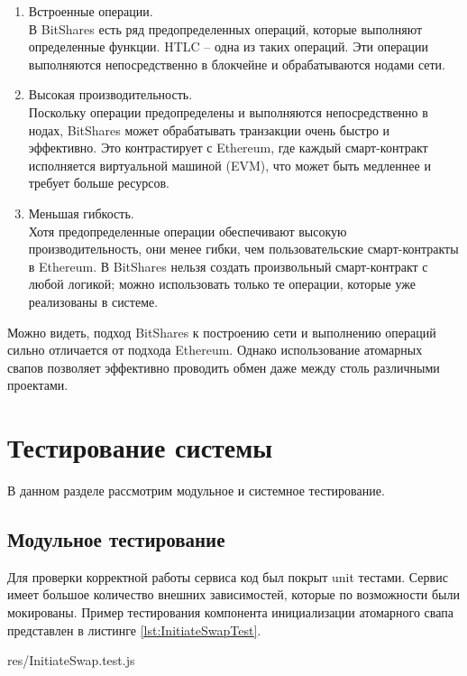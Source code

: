 \begin{enumerate}
\item Встроенные операции.\\
В BitShares есть ряд предопределенных операций, которые выполняют определенные функции. HTLC – одна из таких операций. Эти операции выполняются непосредственно в блокчейне и обрабатываются нодами сети.
\item Высокая производительность.\\
Поскольку операции предопределены и выполняются непосредственно в нодах, BitShares может обрабатывать транзакции очень быстро и эффективно. Это контрастирует с Ethereum, где каждый смарт-контракт исполняется виртуальной машиной (EVM), что может быть медленнее и требует больше ресурсов.
\item Меньшая гибкость.\\
Хотя предопределенные операции обеспечивают высокую производительность, они менее гибки, чем пользовательские смарт-контракты в Ethereum. В BitShares нельзя создать произвольный смарт-контракт с любой логикой; можно использовать только те операции, которые уже реализованы в системе.
\end{enumerate}

Можно видеть, подход BitShares к построению сети и выполнению операций сильно отличается от подхода Ethereum. Однако использование атомарных свапов позволяет эффективно проводить обмен даже между столь различными проектами.

\section{Тестирование системы}

В данном разделе рассмотрим модульное и системное тестирование.

\subsection{Модульное тестирование}

Для проверки корректной работы сервиса код был покрыт unit­ тестами. Сервис имеет большое количество внешних зависимостей, которые по возможности были мокированы. Пример тестирования компонента инициализации атомарного свапа представлен в листинге \ref{lst:InitiateSwapTest}.


{res/InitiateSwap.test.js}

